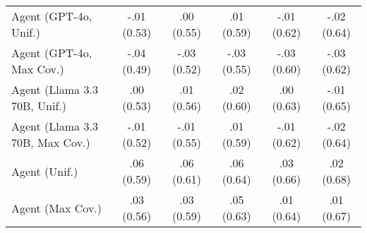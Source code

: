 \begin{table}[h!]
\begin{tabular}{lccccc}
    Agent (GPT-4o, Unif.) & -.01 {\small (0.53)} & .00 {\small (0.55)} & .01 {\small (0.59)} & -.01 {\small (0.62)} & -.02 {\small (0.64)} \\
    Agent (GPT-4o, Max Cov.) & -.04 {\small (0.49)} & -.03 {\small (0.52)} & -.03 {\small (0.55)} & -.03 {\small (0.60)} & -.03 {\small (0.62)} \\
    Agent (Llama 3.3 70B, Unif.) & .00 {\small (0.53)} & .01 {\small (0.56)} & .02 {\small (0.60)} & .00 {\small (0.63)} & -.01 {\small (0.65)} \\
    Agent (Llama 3.3 70B, Max Cov.) & -.01 {\small (0.52)} & -.01 {\small (0.55)} & .01 {\small (0.59)} & -.01 {\small (0.62)} & -.02 {\small (0.64)} \\
    Agent (Unif.) & \cellcolor{bronze!30}.06 {\small (0.59)} & \cellcolor{bronze!30}.06 {\small (0.61)} & \cellcolor{bronze!30}.06 {\small (0.64)} & \cellcolor{bronze!30}.03 {\small (0.66)} & .02 {\small (0.68)} \\
    Agent (Max Cov.) & .03 {\small (0.56)} & .03 {\small (0.59)} & .05 {\small (0.63)} & .01 {\small (0.64)} & .01 {\small (0.67)} \\
    \bottomrule
    \end{tabular}
\end{table}